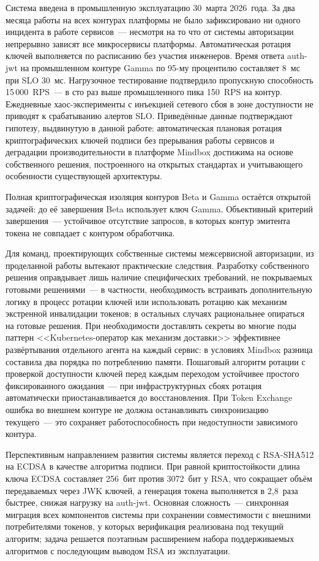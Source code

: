 Система введена в промышленную эксплуатацию 30~марта 2026~года. За два
месяца работы на всех контурах платформы не было зафиксировано ни одного
инцидента в работе сервисов~--- несмотря на то что от системы авторизации
непрерывно зависят все микросервисы платформы. Автоматическая ротация
ключей выполняется по расписанию без участия инженеров. Время ответа auth-jwt
на промышленном контуре Gamma по 95-му процентилю составляет 8~мс при SLO 30~мс.
Нагрузочное тестирование подтвердило пропускную
способность 15\,000~RPS~--- в сто раз выше промышленного
пика 150~RPS на контур. Ежедневные хаос-эксперименты с инъекцией сетевого
сбоя в зоне доступности не приводят к срабатыванию алертов SLO.
Приведённые данные подтверждают гипотезу, выдвинутую в данной работе: автоматическая плановая
ротация криптографических ключей подписи без прерывания работы сервисов
и деградации производительности в платформе Mindbox достижима на основе
собственного решения, построенного на открытых стандартах и учитывающего
особенности существующей архитектуры.

Полная криптографическая изоляция контуров Beta и Gamma остаётся
открытой задачей: до её завершения Beta использует ключ Gamma.
Объективный критерий завершения~--- устойчивое отсутствие запросов,
в которых контур эмитента токена не совпадает с контуром обработчика.

Для команд, проектирующих собственные системы межсервисной авторизации,
из проделанной работы вытекают практические следствия. Разработку собственного
решения оправдывает лишь наличие специфических требований, не покрываемых
готовыми решениями~--- в частности, необходимость встраивать дополнительную
логику в процесс ротации ключей или использовать ротацию как механизм
экстренной инвалидации токенов; в остальных случаях рациональнее опираться
на готовые решения. При необходимости доставлять секреты во многие поды
паттерн <<Kubernetes-оператор как механизм доставки>> эффективнее
развёртывания отдельного агента на каждый сервис: в условиях Mindbox
разница составила два порядка по потреблению памяти. Пошаговый алгоритм
ротации с проверкой доступности ключей перед каждым переходом устойчивее
простого фиксированного ожидания~--- при инфраструктурных сбоях ротация
автоматически приостанавливается до восстановления. При Token Exchange ошибка во внешнем
контуре не должна останавливать синхронизацию текущего~--- это сохраняет
работоспособность при недоступности зависимого контура.

Перспективным направлением развития системы является переход с RSA-SHA512
на ECDSA в качестве алгоритма подписи. При равной криптостойкости длина
ключа ECDSA составляет 256~бит против 3072~бит у RSA, что сокращает
объём передаваемых через JWK ключей, а генерация токена выполняется
в 2,8~раза быстрее, снижая нагрузку на auth-jwt. Основная сложность~--- синхронная
миграция всех компонентов системы при сохранении совместимости с внешними
потребителями токенов, у которых верификация реализована под текущий
алгоритм; задача решается поэтапным расширением набора поддерживаемых
алгоритмов с последующим выводом RSA из эксплуатации.

